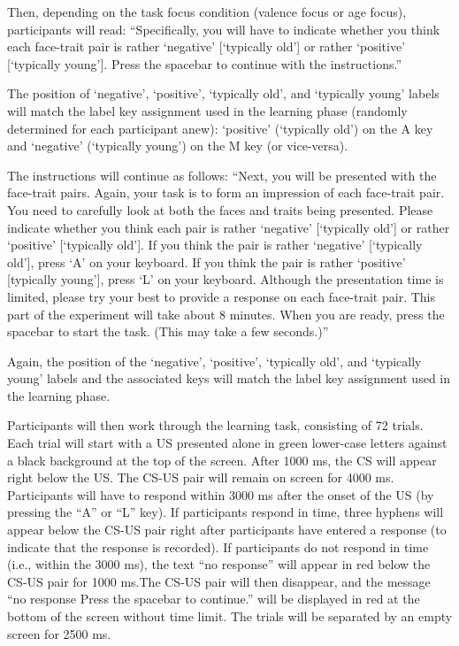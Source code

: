 \documentclass[
  doc,floatsintext]{apa6}
\begin{document}
Then, depending on the task focus condition (valence focus or age focus), participants will read:
``Specifically, you will have to indicate whether you think each face-trait pair is rather `negative' {[}`typically old'{]} or rather `positive' {[}`typically young'{]}.
Press the spacebar to continue with the instructions.''

The position of `negative', `positive', `typically old', and `typically young' labels will match the label key assignment used in the learning phase (randomly determined for each participant anew): `positive' (`typically old') on the A key and `negative' (`typically young') on the M key (or vice-versa).

The instructions will continue as follows:
``Next, you will be presented with the face-trait pairs.
Again, your task is to form an impression of each face-trait pair. You need to carefully look at both the faces and traits being presented.
Please indicate whether you think each pair is rather `negative' {[}`typically old'{]} or rather `positive' {[}`typically old'{]}.
If you think the pair is rather `negative' {[}`typically old'{]}, press `A' on your keyboard.
If you think the pair is rather `positive' {[}typically young'{]}, press `L' on your keyboard.
Although the presentation time is limited,
please try your best to provide a response on each face-trait pair.
This part of the experiment will take about 8 minutes.
When you are ready, press the spacebar to start the task.
(This may take a few seconds.)''

Again, the position of the `negative', `positive', `typically old', and `typically young' labels and the associated keys will match the label key assignment used in the learning phase.

Participants will then work through the learning task, consisting of 72 trials.
Each trial will start with a US presented alone in green lower-case letters against a black background at the top of the screen. After 1000 ms, the CS will appear right below the US.
The CS-US pair will remain on screen for 4000 ms.
Participants will have to respond within 3000 ms after the onset of the US (by pressing the ``A'' or ``L'' key).
If participants respond in time, three hyphens will appear below the CS-US pair right after participants have entered a response (to indicate that the response is recorded).
If participants do not respond in time (i.e., within the 3000 ms), the text ``no response'' will appear in red below the CS-US pair for 1000 ms.The CS-US pair will then disappear, and the message ``no response Press the spacebar to continue.'' will be displayed in red at the bottom of the screen without time limit.
The trials will be separated by an empty screen for 2500 ms.
\end{document}
